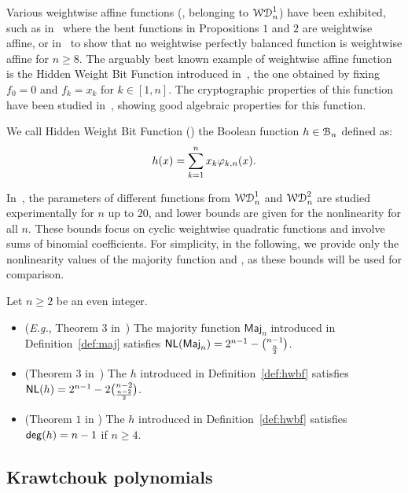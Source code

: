 \documentclass{llncs}
\begin{document}
Various weightwise affine functions (\ie, belonging to $\mathcal{WD}^{1}_{n}$) have been exhibited, such as in~\cite{TOSC:CarMeaRot17} where the bent functions in Propositions $1$ and $2$ are weightwise affine, or in~\cite{DAM:GinMea22} to show that no weightwise perfectly balanced function is weightwise affine for $n\geq 8$. The arguably best known example of weightwise affine function is the Hidden Weight Bit Function introduced in~\cite{IEEE:Bryant91}, the one obtained by fixing $f_0=0$ and $f_k=x_k$ for $k \in [1,n]$. The cryptographic properties of this function have been studied in~\cite{DAM:WCST14}, showing good algebraic properties for this function.

\begin{definition}\label{def:hwbf}
    We call Hidden Weight Bit Function (\hwbf{}) the Boolean function $h\in\mathcal{B}_n$ defined as:
	\[
		h(x)=\sum_{k=1}^{n}x_k\varphi_{k,n}(x).
	\]
\end{definition}

In~\cite{DAM:MeaOza24}, the parameters of different functions from $\mathcal{WD}^{1}_{n}$ and $\mathcal{WD}^{2}_{n}$ are studied experimentally for $n$ up to $20$, and lower bounds are given for the nonlinearity for all $n$. These bounds focus on cyclic weightwise quadratic functions and involve sums of binomial coefficients. For simplicity, in the following, we provide only the nonlinearity values of the majority function and \hwbf{}, as these bounds will be used for comparison.

\begin{Prop}\label{prop:wwd1}
	Let $n\geq 2$ be an even integer.
	\begin{itemize}
		\item (\textit{E.g.}, Theorem $3$ in~\cite{DCC:DalMaiSar06}) The majority function $\mathsf{Maj}_n$ introduced in Definition~\ref{def:maj} satisfies $\mathsf{NL}(\mathsf{Maj}_n)=2^{n-1}-\binom{n-1}{\frac n2}$.
		\item (Theorem $3$ in~\cite{DAM:WCST14}) The \hwbf{} $h$ introduced in Definition~\ref{def:hwbf} satisfies $\mathsf{NL}(h)=2^{n-1}-2\binom{n-2}{\frac{n-2}{2}}$.
		\item (Theorem $1$ in \cite{DAM:WCST14}) The \hwbf{} $h$ introduced in Definition~\ref{def:hwbf} satisfies $\mathsf{deg}(h)=n-1$ if $n\geq 4$.
	\end{itemize}
\end{Prop}

\subsection{Krawtchouk polynomials}
\end{document}
